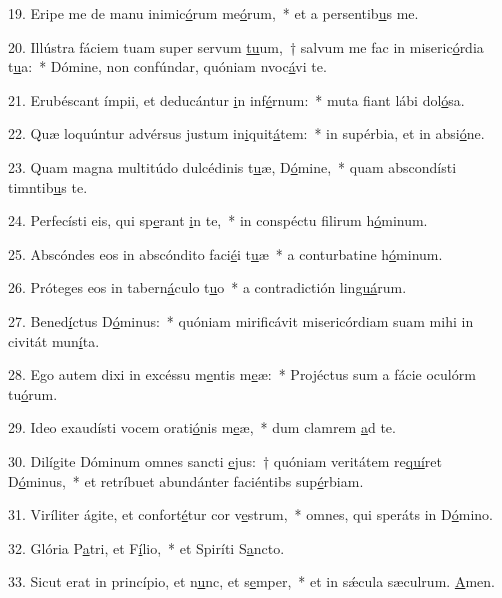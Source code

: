 19. Eripe me de manu inimic\uline{ó}rum me\uline{ó}rum,~* et a persentib\uline{u}s me.\par 
20. Illústra fáciem tuam super servum \uline{tu}um,~† salvum me fac in miseric\uline{ó}rdia t\uline{u}a:~* Dómine, non confúndar, quóniam nvoc\uline{á}vi te.\par 
21. Erubéscant ímpii, et deducántur \uline{i}n inf\uline{é}rnum:~* muta fiant lábi dol\uline{ó}sa.\par 
22. Quæ loquúntur advérsus justum in\uline{i}quit\uline{á}tem:~* in supérbia, et in absi\uline{ó}ne.\par 
23. Quam magna multitúdo dulcédinis t\uline{u}æ, D\uline{ó}mine,~* quam abscondísti timntib\uline{u}s te.\par 
24. Perfecísti eis, qui sp\uline{e}rant \uline{i}n te,~* in conspéctu filirum h\uline{ó}minum.\par 
25. Abscóndes eos in abscóndito faci\uline{é}i t\uline{u}æ~* a conturbatine h\uline{ó}minum.\par 
26. Próteges eos in tabern\uline{á}culo t\uline{u}o~* a contradictión lin\uline{guá}rum.\par 
27. Bened\uline{í}ctus D\uline{ó}minus:~* quóniam mirificávit misericórdiam suam mihi in civitát mun\uline{í}ta.\par 
28. Ego autem dixi in excéssu m\uline{e}ntis m\uline{e}æ:~* Projéctus sum a fácie oculórm tu\uline{ó}rum.\par 
29. Ideo exaudísti vocem orati\uline{ó}nis m\uline{e}æ,~* dum clamrem \uline{a}d te.\par 
30. Dilígite Dóminum omnes sancti \uline{e}jus:~† quóniam veritátem re\uline{quí}ret D\uline{ó}minus,~* et retríbuet abundánter faciéntibs sup\uline{é}rbiam.\par 
31. Viríliter ágite, et confort\uline{é}tur cor v\uline{e}strum,~* omnes, qui speráts in D\uline{ó}mino.\par 
32. Glória P\uline{a}tri, et F\uline{í}lio,~* et Spiríti S\uline{a}ncto.\par 
33. Sicut erat in princípio, et n\uline{u}nc, et s\uline{e}mper,~* et in sǽcula sæculrum. \uline{A}men.\par 
